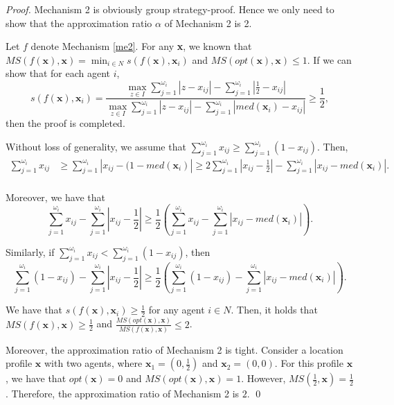 \documentclass[runningheads]{11llncst}
\begin{document}
\begin{proof}
     Mechanism 2 is obviously group strategy-proof. Hence we only need to show that the approximation ratio $\alpha$ of Mechanism 2 is 2.
     
     
     Let $f$ denote Mechanism \ref{me2}. For any  \textbf{x}, we known that  
     $MS(f(\textbf{x}),\textbf{x})=\min_{i\in N}s(f(\textbf{x}),\textbf{x}_i)$ and $MS(opt(\textbf{x}),\textbf{x})\leq 1$.  If we can show that for each agent $i$, $$s(f(\textbf{x}),\textbf{x}_i)=\frac{\max_{z\in I}\sum_{j=1}^{\omega_i}|z-x_{ij}|-\sum_{j=1}^{\omega_i}|\frac{1}{2}-x_{ij}|}{\max_{z\in I}\sum_{j=1}^{\omega_i}|z-x_{ij}|-\sum_{j=1}^{\omega_i}|med(\textbf{x}_i)-x_{ij}|}\geq\frac{1}{2},$$ then the proof is completed. 
    
    Without loss of generality, we assume that $\sum_{j=1}^{\omega_i}x_{ij}\geq\sum_{j=1}^{\omega_i}(1-x_{ij})$. Then, 
    \begin{equation*}
        \begin{aligned}   \sum_{j=1}^{\omega_i}x_{ij}&\geq\sum_{j=1}^{\omega_i}|x_{ij}-(1-med(\textbf{x}_i)|\geq2 \sum_{j=1}^{\omega_i}\left|x_{ij}-\frac{1}{2}\right|-\sum_{j=1}^{\omega_i}|x_{ij}-med(\textbf{x}_i)|.\\
        \end{aligned}
    \end{equation*}

    Moreover, we have that  $$ \sum_{j=1}^{\omega_i}x_{ij}-\sum_{j=1}^{\omega_i}\left|x_{ij}-\frac{1}{2}\right|\geq\frac{1}{2}\left(\sum_{j=1}^{\omega_i}x_{ij}-\sum_{j=1}^{\omega_i}|x_{ij}-med(\textbf{x}_i)|\right).$$

      Similarly, if $\sum_{j=1}^{\omega_i}x_{ij}<\sum_{j=1}^{\omega_i}(1-x_{ij})$, then  $$ \sum_{j=1}^{\omega_i}(1-x_{ij})-\sum_{j=1}^{\omega_i}\left|x_{ij}-\frac{1}{2}\right|\geq\frac{1}{2}\left(\sum_{j=1}^{\omega_i}(1-x_{ij})-\sum_{j=1}^{\omega_i}|x_{ij}-med(\textbf{x}_i)|\right).$$
    
We have that $s(f(\textbf{x}),\textbf{x}_i)\geq\frac{1}{2}$ for any agent $i\in N$. Then, it holds that $MS(f(\textbf{x}),\textbf{x})\geq\frac{1}{2}$ and $\frac{MS(opt(\textbf{x}),\textbf{x})}{MS(f(\textbf{x}),\textbf{x})}\leq 2$.

Moreover, the approximation ratio of Mechanism 2 is tight. Consider a location profile $\textbf{x}$ with two agents, where  $\textbf{x}_1=(0,\frac{1}{2})$ and $\textbf{x}_2=(0,0)$. For this profile $\textbf{x}$, we have that $opt(\textbf{x})=0$ and $MS(opt(\textbf{x}),\textbf{x})=1$. However,  $MS(\frac{1}{2},\textbf{x})=\frac{1}{2}$. Therefore, the  approximation ratio of Mechanism 2 is $2$. \qed
\end{proof}
\end{document}
